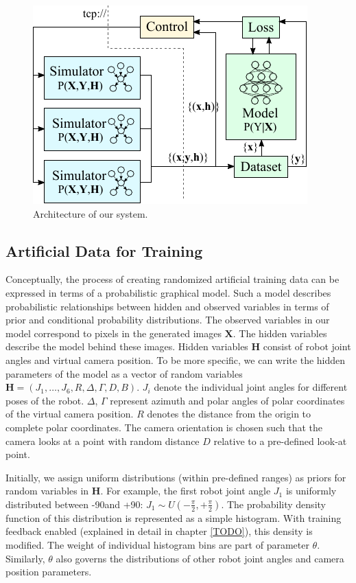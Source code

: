 \documentclass[conference]{IEEEtran}
\begin{document}
    \begin{figure}[htbp]
        \centerline{\includegraphics[width=0.9\columnwidth]{figures/architecture/overview.pdf}}
        \caption{\label{fig:architecture} Architecture of our system.}
    \end{figure}


\subsection{Artificial Data for Training}

    Conceptually, the process of creating randomized artificial training data can be expressed in terms of a  probabilistic graphical model. Such a model describes probabilistic relationships between hidden and observed variables in terms of prior and conditional probability distributions. The observed variables in our model correspond to pixels in the generated images $\mathbf{X}$. The hidden variables describe the model behind these images. Hidden variables $\mathbf{H}$ consist of robot joint angles and virtual camera position. To be more specific, we can write the hidden parameters of the model as a vector of random variables $\mathbf{H} = (J_1, \dots, J_6, R, \Delta, \Gamma, D, B)$. $J_i$ denote the individual joint angles for different poses of the robot. $\Delta$, $\Gamma$  represent azimuth and polar angles of polar coordinates of the virtual camera position. $R$ denotes the distance from the origin to complete polar coordinates. The camera orientation is chosen such that the camera looks at a point with random distance $D$ relative to a pre-defined look-at point. 
    
    Initially, we assign uniform distributions (within pre-defined ranges) as priors for random variables in $\mathbf{H}$. For example, the first robot joint angle $J_1$ is uniformly distributed between -90\textdegree and +90\textdegree: $J_1 \sim U(-\frac{\pi}{2}, +\frac{\pi}{2})$. The probability density function of this distribution is represented as a simple histogram.  With training feedback enabled (explained in detail in chapter \ref{TODO}), this density is modified. The weight of individual histogram bins are part of parameter $\theta$. Similarly, $\theta$ also governs the distributions of other robot joint angles and camera position parameters.
    
\end{document}
